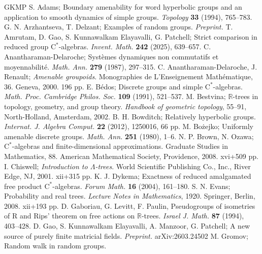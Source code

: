 \documentclass[12pt,nosumlimits,nonamelimits]{amsart}
\theoremstyle{remark}
\theoremstyle{definition}
\begin{document}
%
%
\begin{thebibliography}{GKMP}
%
 S. Adams; 
Boundary amenability for word hyperbolic groups 
and an application to smooth dynamics of simple groups. 
\emph{Topology} \textbf{33} (1994), 765--783. 
%
 G. N. Arzhantseva, T. Delzant; 
Examples of random groups.
\emph{Preprint.} 
%
 T. Amrutam, D. Gao, S. Kunnawalkam Elayavalli, G. Patchell;
Strict comparison in reduced group $\mathrm{C}^*$-alge\-bras. 
\emph{Invent. Math.} \textbf{242} (2025), 639--657.
%
 C. Anantharaman-Delaroche; 
Syst\`{e}mes dynamiques non commutatifs et moyennabilit\'{e}. 
\emph{Math. Ann.} \textbf{279} (1987), 297--315. 
%
 C. Anantharaman-Delaroche, J. Renault; 
\emph{Amenable groupoids}. 
Monographies de L'Ensei\-gne\-ment Math\'{e}matique, 36. 
Geneva, 2000. 196 pp. 
%
 E. B\'{e}dos; 
Discrete groups and simple $\mathrm{C}^*$-algebras. 
\emph{Math. Proc. Cambridge Philos. Soc.} \textbf{109} (1991), 521--537. 
%
 M. Bestvina;
$\mathbb{R}$-trees in topology, geometry, and group theory. 
\emph{Handbook of geometric topology}, 55--91, 
North-Holland, Amsterdam, 2002.
%
 B. H. Bowditch; 
Relatively hyperbolic groups. 
\emph{Internat. J. Algebra Comput.} \textbf{22} (2012), 1250016, 66 pp.
%
 M. Bo\.{z}ejko;
Uniformly amenable discrete groups.
\emph{Math. Ann.} \textbf{251} (1980), 1--6.
%
 N. P. Brown, N. Ozawa; 
$\mathrm{C}^*$-algebras and finite-dimensional approximations. 
Graduate Studies in Mathematics, 88. 
American Mathematical Society, Providence, 2008. xvi+509 pp. 
%
 I. Chiswell; 
\emph{Introduction to $\Lambda$-trees}. 
World Scientific Publishing Co., Inc., River Edge, NJ, 2001. xii+315 pp. 
%
 K. J. Dykema; 
Exactness of reduced amalgamated free product $\mathrm{C}^*$-algebras. 
\emph{Forum Math.} \textbf{16} (2004), 161--180.
%
 S. N. Evans;
Probability and real trees.
\emph{Lecture Notes in Mathematics}, 1920. Springer, Berlin, 2008. xii+193 pp.
%
 D. Gaboriau, G. Levitt, F. Paulin, 
Pseudogroups of isometries of R and Rips' theorem 
on free actions on $\mathbb{R}$-trees. 
\emph{Israel J. Math.} \textbf{87} (1994), 403--428. 
%
 D. Gao, S. Kunnawalkam Elayavalli, A. Manzoor, G. Patchell;
A new source of purely finite matricial fields.
\emph{Preprint.} arXiv:2603.24502
%
 M. Gromov;
Random walk in random groups.

\end{thebibliography}
\end{document}
